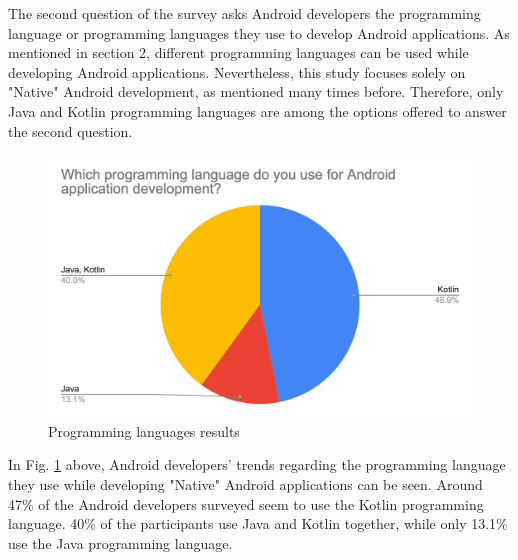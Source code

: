 The second question of the survey asks Android developers the programming language or programming languages they use to develop Android applications. As mentioned in section 2, different programming languages can be used while developing Android applications. Nevertheless, this study focuses solely on "Native" Android development, as mentioned many times before. Therefore, only Java and Kotlin programming languages are among the options offered to answer the second question.
\begin{figure}[ht!]
    \centering
    \includegraphics[scale=0.3]{figures/survey_q2_programming_language.png}
    \caption{Programming languages results}
    \label{fig:programming_languages}
\end{figure}

In Fig. \ref{fig:programming_languages} above, Android developers' trends regarding the programming language they use while developing "Native" Android applications can be seen. Around 47\% of the Android developers surveyed seem to use the Kotlin programming language. 40\% of the participants use Java and Kotlin together, while only 13.1\% use the Java programming language.